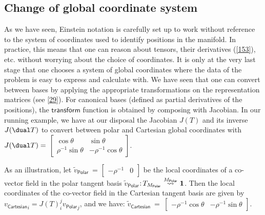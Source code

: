 \documentclass[nolinenum]{jfp}
\begin{document}
\subsection{Change of global coordinate system}\label{136} As we have seen, Einstein
notation is carefully set up to work without reference to the system
of coordinates used to identify positions in the manifold. In
practice, this means that one can reason about tensors, their
derivatives (\cref{153}), etc. without worrying about the choice
of coordinates. It is only at the very last stage that one chooses a
system of global coordinates where the data of the problem is easy to express
and calculate with. We have seen that one can convert between bases by
applying the appropriate transformations on the representation matrices (see \cref{29}).
For canonical bases (defined as partial derivatives of the positions), the
\(\mathsf{transform}\) function is obtained by composing with
Jacobian.
In our running example, we have at our disposal the Jacobian \(J(T)\) and its inverse \(J(\dual T)\) to convert between polar and Cartesian
global coordinates with \(J(\dual T) = \) \(\left[\begin{array}{cc}\cos{θ}&\sin{θ}\\ρ^{-1}\sin{θ}&-ρ^{-1}\cos{θ}\end{array}\right]\).

As an illustration, let \(\tilde v_{\mathsf{Polar}}\) =
\(\left[\begin{array}{cc}-ρ^{-1}&0\end{array}\right]\) be the local coordinates of a co-vector field in the polar tangent basis
\(\tilde v_{\mathsf{Polar}}\)\(\mathnormal{:}\mskip 3.0muT_{M_{\mathsf{Polar}}}\mskip 1.0mu\overset{M_{\mathsf{Polar}}}{\leadsto }\mskip 1.0mu\mathbf{1}\).
 Then the local coordinates of the co-vector field in the Cartesian tangent
basis are given by \({v_{\mathsf{Cartesian}}}_i = J(T)_i^j {v_{\mathsf{Polar}}}_j\), and we have: \(\tilde v_{\mathsf{Cartesian}}\) = \(\left[\begin{array}{cc}-ρ^{-1}\cos{θ}&-ρ^{-1}\sin{θ}\end{array}\right]\).
\end{document}
